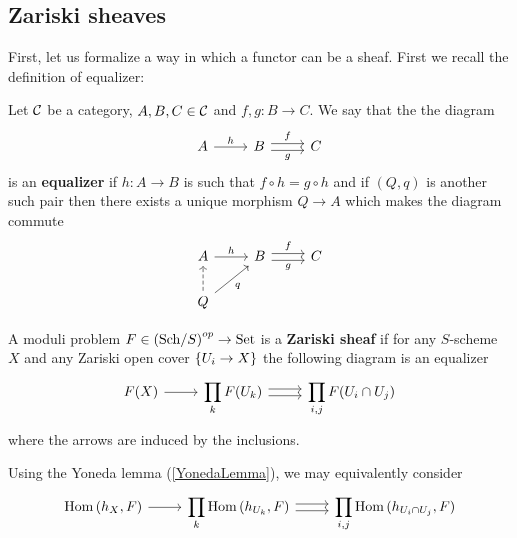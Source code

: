\subsection{Zariski sheaves}
First, let us formalize a way in which a functor can be a sheaf. First we recall the definition of equalizer:

\begin{definition}[Equalizer]
Let $\mathcal{C}$ be a category, $A,B,C\in \mathcal{C}$ and $f,g:B\to C$. We say that the the diagram 
\[\begin{tikzcd}
	A & B & C
	\arrow["h", from=1-1, to=1-2]
	\arrow["f", shift left, from=1-2, to=1-3]
	\arrow["g"', shift right, from=1-2, to=1-3]
\end{tikzcd}\]
is an \textbf{equalizer} if $h:A\to B$ is such that $f\circ h=g\circ h$ and if $(Q,q)$ is another such pair then there exists a unique morphism $Q\to A$ which makes the diagram commute
\[\begin{tikzcd}
	A & B & C \\
	Q
	\arrow["h", from=1-1, to=1-2]
	\arrow["f", shift left, from=1-2, to=1-3]
	\arrow["g"', shift right, from=1-2, to=1-3]
	\arrow["q"', from=2-1, to=1-2]
	\arrow[dashed, from=2-1, to=1-1]
\end{tikzcd}\]
\end{definition}

\begin{definition}
A moduli problem $F\in \left({\mathrm{Sch}}/{S}\right)^{op}\to \mathrm{Set}$ is a \textbf{Zariski sheaf} if for any $S$-scheme $X$ and any Zariski open cover $\left\{{U_i\to X}\right\}$ the following diagram is an equalizer
\[\begin{tikzcd}
	{F(X)} & {\displaystyle \prod_k F(U_k)} & {\displaystyle \prod_{i,j}F(U_i\cap U_j)}
	\arrow[from=1-1, to=1-2]
	\arrow[shift left, from=1-2, to=1-3]
	\arrow[shift right, from=1-2, to=1-3]
\end{tikzcd}\]
where the arrows are induced by the inclusions.
\end{definition}

\begin{remark}
Using the Yoneda lemma (\ref{YonedaLemma}), we may equivalently consider
\[\begin{tikzcd}
	{\Hom(h_X,F)} & {\displaystyle \prod_k \Hom(h_{U_k},F)} & {\displaystyle \prod_{i,j}\Hom(h_{U_i\cap U_j},F)}
	\arrow[from=1-1, to=1-2]
	\arrow[shift left, from=1-2, to=1-3]
	\arrow[shift right, from=1-2, to=1-3]
\end{tikzcd}\]
\end{remark}


